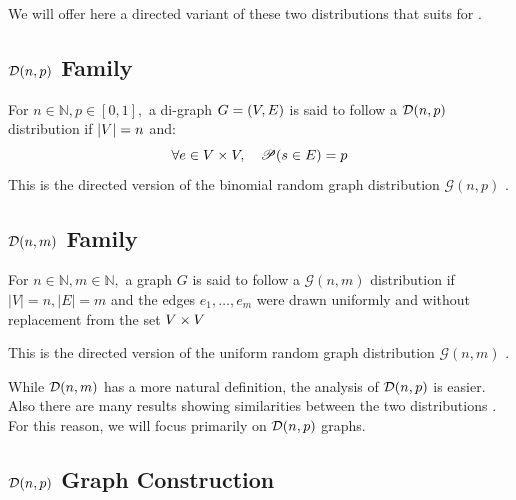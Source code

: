 We will offer here a directed variant of these two distributions that suits for .
\subsection{$\mathcal{D}(n,p)$ Family}
For $n\in\mathbb{N},p\in[0,1],$ a di-graph $G=(V,E)$ is said to follow a $\mathcal{D}(n,p)$ distribution if $\lvert V \rvert=n$ and:
$$
\forall e\in V\times V, \quad \mathscr{P}(s\in E)=p
$$
This is the directed version of the binomial random graph distribution $\mathcal{G}(n,p)$ \cite[Section.~1.1]{RandomGraphs}.

\subsection{$\mathcal{D}(n,m)$ Family}
For $n\in\mathbb{N},m\in\mathbb{N},$ a graph $G$ is said to follow a $\mathcal{G}(n,m)$ distribution if $\lvert V \rvert=n,\lvert  E \rvert=m$ and the edges $e_1,\dots,e_m$ were drawn uniformly and without replacement from the set $V\times V$

This is the directed version of the uniform random graph distribution $\mathcal{G}(n,m)$ \cite[Section.~1.1]{RandomGraphs}.

While $\mathcal{D}(n,m)$ has a more natural definition, the analysis of $\mathcal{D}(n,p)$ is easier. Also there are many results showing similarities between the two distributions \cite[Section.~1.1]{RandomGraphs}. For this reason, we will focus primarily on $\mathcal{D}(n,p)$ graphs.

\subsection{$\mathcal{D}(n,p)$ Graph Construction}


